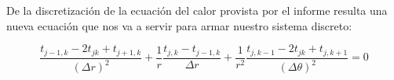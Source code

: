 

De la discretización de la ecuación del calor provista por el informe resulta una nueva ecuación que nos va a servir para armar nuestro sistema discreto:

\begin{equation}\label{calor}
\frac{t_{j-1,k}-2t_{jk}+t_{j+1,k}}{(\Delta r)^2}+\frac{1}{r}\frac{t_{j,k}-t_{j-1,k}}{\Delta r}+\frac{1}{r^2}\frac{t_{j,k-1}-2t_{jk}+t_{j,k+1}}{(\Delta \theta)^2} = 0 
\end{equation}

